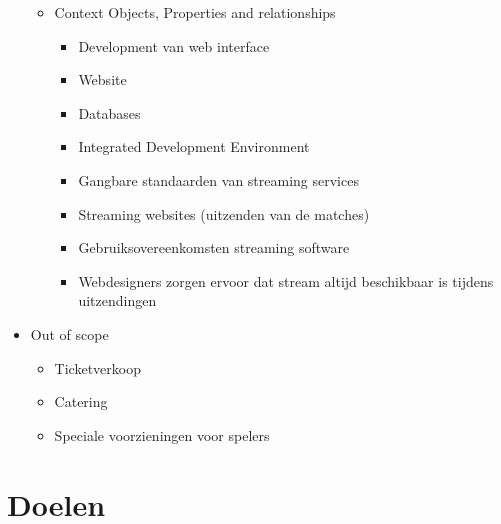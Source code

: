 \documentclass[12pt,a4paper]{article}
\begin{document}
\begin{itemize}
\begin{itemize}
\begin{itemize}
				\end{itemize}
				\item Context Objects, Properties and relationships
				\begin{itemize}
					\item Development van web interface
					\item Website
					\item Databases
					\item Integrated Development Environment
					\item Gangbare standaarden van streaming services
					\item Streaming websites (uitzenden van de matches)
					\item Gebruiksovereenkomsten streaming software
					\item Webdesigners zorgen ervoor dat stream altijd beschikbaar is tijdens uitzendingen
				\end{itemize}
			\end{itemize}
			\item Out of scope
			\begin{itemize}
				\item Ticketverkoop
				\item Catering
				\item Speciale voorzieningen voor spelers
			\end{itemize}
		\end{itemize}
		\section{Doelen}
\end{document}
